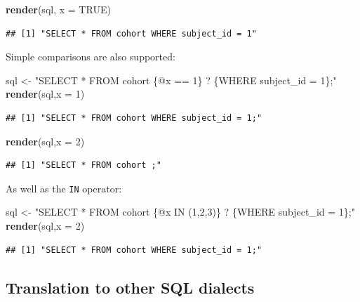 \documentclass[11pt]{book}
\newenvironment{Shaded}{\begin{snugshade}}{\end{snugshade}}
\newcommand{\KeywordTok}[1]{\textcolor[rgb]{0.13,0.29,0.53}{\textbf{#1}}}
\newcommand{\DataTypeTok}[1]{\textcolor[rgb]{0.13,0.29,0.53}{#1}}
\newcommand{\DecValTok}[1]{\textcolor[rgb]{0.00,0.00,0.81}{#1}}
\newcommand{\StringTok}[1]{\textcolor[rgb]{0.31,0.60,0.02}{#1}}
\newcommand{\OtherTok}[1]{\textcolor[rgb]{0.56,0.35,0.01}{#1}}
\newcommand{\NormalTok}[1]{#1}
\begin{document}
\begin{Shaded}
\begin{Highlighting}[]
\KeywordTok{render}\NormalTok{(sql, }\DataTypeTok{x =} \OtherTok{TRUE}\NormalTok{)}
\end{Highlighting}
\end{Shaded}

\begin{verbatim}
## [1] "SELECT * FROM cohort WHERE subject_id = 1"
\end{verbatim}

Simple comparisons are also supported:

\begin{Shaded}
\begin{Highlighting}[]
\NormalTok{sql <-}\StringTok{ "SELECT * FROM cohort \{@x == 1\} ? \{WHERE subject_id = 1\};"}
\KeywordTok{render}\NormalTok{(sql,}\DataTypeTok{x =} \DecValTok{1}\NormalTok{)}
\end{Highlighting}
\end{Shaded}

\begin{verbatim}
## [1] "SELECT * FROM cohort WHERE subject_id = 1;"
\end{verbatim}

\begin{Shaded}
\begin{Highlighting}[]
\KeywordTok{render}\NormalTok{(sql,}\DataTypeTok{x =} \DecValTok{2}\NormalTok{)}
\end{Highlighting}
\end{Shaded}

\begin{verbatim}
## [1] "SELECT * FROM cohort ;"
\end{verbatim}

As well as the \texttt{IN} operator:

\begin{Shaded}
\begin{Highlighting}[]
\NormalTok{sql <-}\StringTok{ "SELECT * FROM cohort \{@x IN (1,2,3)\} ? \{WHERE subject_id = 1\};"}
\KeywordTok{render}\NormalTok{(sql,}\DataTypeTok{x =} \DecValTok{2}\NormalTok{)}
\end{Highlighting}
\end{Shaded}

\begin{verbatim}
## [1] "SELECT * FROM cohort WHERE subject_id = 1;"
\end{verbatim}

\subsection{Translation to other SQL
dialects}\label{translation-to-other-sql-dialects}
\end{document}
